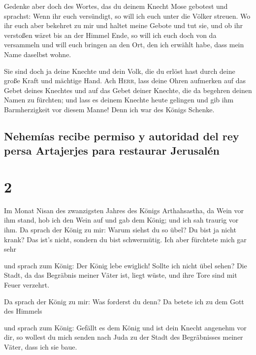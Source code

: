  Gedenke aber doch des Wortes, das du deinem Knecht Mose
gebotest und sprachst: Wenn ihr euch versündigt, so will ich euch unter
die Völker streuen.  Wo ihr euch aber bekehret zu mir und
haltet meine Gebote und tut sie, und ob ihr verstoßen wäret bis an der
Himmel Ende, so will ich euch doch von da versammeln und will euch
bringen an den Ort, den ich erwählt habe, dass mein Name daselbst wohne.

 Sie sind doch ja deine Knechte und dein Volk, die du
erlöst hast durch deine große Kraft und mächtige Hand. 
Ach \textsc{Herr}, lass deine Ohren aufmerken auf das Gebet deines
Knechtes und auf das Gebet deiner Knechte, die da begehren deinen Namen
zu fürchten; und lass es deinem Knechte heute gelingen und gib ihm
Barmherzigkeit vor diesem Manne! Denn ich war des Königs Schenke.

\hypertarget{nehemuxedas-recibe-permiso-y-autoridad-del-rey-persa-artajerjes-para-restaurar-jerusaluxe9n}{%
\subsection{Nehemías recibe permiso y autoridad del rey persa Artajerjes
para restaurar
Jerusalén}\label{nehemuxedas-recibe-permiso-y-autoridad-del-rey-persa-artajerjes-para-restaurar-jerusaluxe9n}}

\hypertarget{section-1}{%
\section{2}\label{section-1}}

 Im Monat Nisan des zwanzigsten Jahres des Königs
Arthahsastha, da Wein vor ihm stand, hob ich den Wein auf und gab dem
König; und ich sah traurig vor ihm.  Da sprach der König
zu mir: Warum siehst du so übel? Du bist ja nicht krank? Das ist's
nicht, sondern du bist schwermütig. Ich aber fürchtete mich gar sehr

 und sprach zum König: Der König lebe ewiglich! Sollte ich
nicht übel sehen? Die Stadt, da das Begräbnis meiner Väter ist, liegt
wüste, und ihre Tore sind mit Feuer verzehrt.

 Da sprach der König zu mir: Was forderst du denn? Da
betete ich zu dem Gott des Himmels

 und sprach zum König: Gefällt es dem König und ist dein
Knecht angenehm vor dir, so wollest du mich senden nach Juda zu der
Stadt des Begräbnisses meiner Väter, dass ich sie baue.

